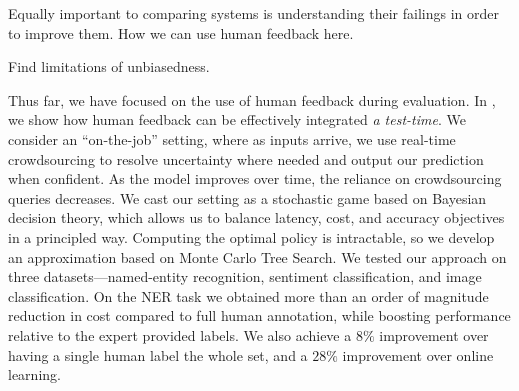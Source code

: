 Equally important to comparing systems is understanding their failings in order to improve them.
How we can use human feedback here.

Find limitations of unbiasedness.

Thus far, we have focused on the use of human feedback during evaluation.
In , we show how human feedback can be effectively integrated \textit{a test-time}.
We consider an ``on-the-job'' setting, where as inputs arrive, we use real-time crowdsourcing to resolve uncertainty where needed and output our prediction when confident.
As the model improves over time, the reliance on crowdsourcing queries
decreases. 
We cast our setting as a stochastic game based on Bayesian decision
theory, which allows us to balance latency, cost, and accuracy objectives in a principled way. 
Computing the optimal policy is intractable, so we develop an approximation based on Monte Carlo Tree Search.
We tested our approach on three datasets---named-entity recognition, sentiment classification, and image classification.
On the NER task we obtained more than an order of magnitude reduction in cost compared to full human annotation, while boosting performance relative to the expert provided labels.
We also achieve a $8\%$ \fone{} improvement over having a single human label the whole set, and a $28\%$ \fone{} improvement over online learning.


% 
% 
% 




